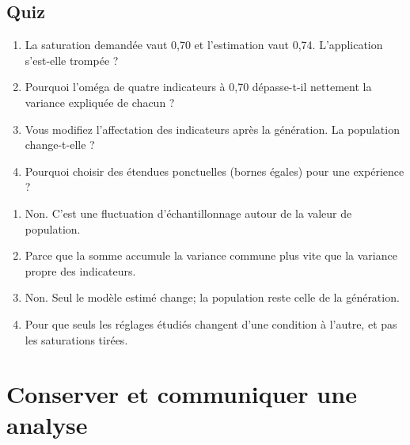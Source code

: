 \documentclass[
  french,
  11pt,
  a4paper,
  DIV=11,
  numbers=noendperiod]{scrreprt}
\providecommand{\tightlist}{%
  \setlength{\itemsep}{0pt}\setlength{\parskip}{0pt}}
\begin{document}
\section{Quiz}\label{quiz-10}

\begin{enumerate}
\def\labelenumi{\arabic{enumi}.}
\tightlist
\item
  La saturation demandée vaut 0,70 et l'estimation vaut 0,74.
  L'application s'est-elle trompée ?
\item
  Pourquoi l'oméga de quatre indicateurs à 0,70 dépasse-t-il nettement
  la variance expliquée de chacun ?
\item
  Vous modifiez l'affectation des indicateurs après la génération. La
  population change-t-elle ?
\item
  Pourquoi choisir des étendues ponctuelles (bornes égales) pour une
  expérience ?
\end{enumerate}

\begin{tcolorbox}[enhanced jigsaw, arc=.35mm, bottomrule=.15mm, bottomtitle=1mm, breakable, colback=white, colbacktitle=quarto-callout-tip-color!10!white, colframe=quarto-callout-tip-color-frame, coltitle=black, left=2mm, leftrule=.75mm, opacityback=0, opacitybacktitle=0.6, rightrule=.15mm, title={Réponses}, titlerule=0mm, toprule=.15mm, toptitle=1mm]

\begin{enumerate}
\def\labelenumi{\arabic{enumi}.}
\tightlist
\item
  Non. C'est une fluctuation d'échantillonnage autour de la valeur de
  population.
\item
  Parce que la somme accumule la variance commune plus vite que la
  variance propre des indicateurs.
\item
  Non. Seul le modèle estimé change; la population reste celle de la
  génération.
\item
  Pour que seuls les réglages étudiés changent d'une condition à
  l'autre, et pas les saturations tirées.
\end{enumerate}

\end{tcolorbox}


\chapter{Conserver et communiquer une analyse}\label{sec-rapport}
\end{document}
